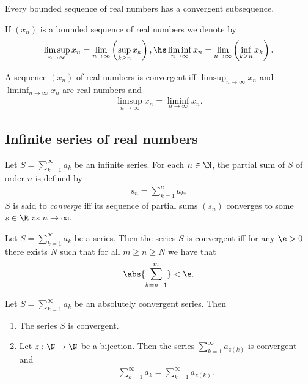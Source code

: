 \documentclass{article}
\begin{document}
\begin{theorem}
	Every bounded sequence of real numbers has a convergent subsequence.
\end{theorem}

\begin{definition}
	If $(x_n)$ is a bounded sequence of real numbers we denote by
	\begin{align*}
		\limsup_{n\to\infty} x_n = \lim_{n\to\infty}\left(\sup_{k\geq n}x_k\right),\hs
		\liminf_{n\to\infty} x_n = \lim_{n\to\infty}\left(\inf_{k\geq n}x_k\right).
	\end{align*}
\end{definition}

\begin{theorem}[Notes 1.6]
	A sequence $(x_n)$ of real numbers is convergent iff $\limsup_{n\to\infty}x_n$
	and $\liminf_{n\to\infty}x_n$ are real numbers and
	\begin{align*}
		\limsup_{n\to\infty}x_n =\liminf_{n\to\infty} x_n.
	\end{align*}
\end{theorem}

\subsection{Infinite series of real numbers}

\begin{definition}
	Let $S=\sum_{k=1}^\infty a_k$ be an infinite series. For each $n\in\N$, the partial
	sum of $S$ of order $n$ is defined by
	\begin{align*}
		s_n = \sum_{k=1}^n a_k.
	\end{align*}
	$S$ is said to \emph{converge} iff its sequence of partial sums $(s_n)$
	converges to some $s\in\R$ as $n\to\infty$.
\end{definition}

\begin{theorem}
	Let $S=\sum_{k=1}^\infty a_k$ be a series. Then the series $S$ is convergent
	iff for any $\e>0$ there exists $N$ such that for all $m\geq n\geq N$
	we have that
	\begin{align*}
		\abs{\sum_{k=n+1}^m}<\e.
	\end{align*}
\end{theorem}

\begin{theorem}[Notes 1.8]
	Let $S=\sum_{k=1}^\infty a_k$ be an absolutely convergent series. Then
	\begin{enumerate}
		\item The series $S$ is convergent.
		\item Let $z:\N\to\N$ be a bijection. Then the series $\sum_{k=1}^\infty a_{z(k)}$
		      is convergent and \begin{align*}
			      \sum_{k=1}^\infty a_k = \sum_{k=1}^\infty a_{z(k)}.
		      \end{align*}
	\end{enumerate}
\end{theorem}
\end{document}

